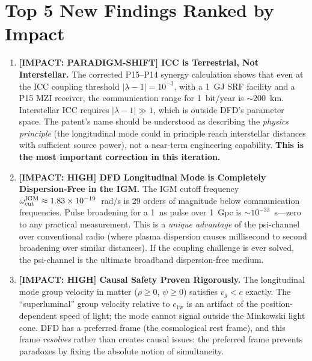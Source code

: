 \documentclass[11pt]{article}
\newcommand{\ee}[1]{\times 10^{#1}}
\newcommand{\cfield}{c_{1\mathrm{w}}}
\begin{document}
\section{Top 5 New Findings Ranked by Impact}
\label{sec:top5}

\begin{enumerate}[leftmargin=*]

\item \textbf{[IMPACT: PARADIGM-SHIFT] ICC is Terrestrial, Not Interstellar.}
The corrected P15--P14 synergy calculation shows that even at the
ICC coupling threshold $|\lambda-1| = 10^{-3}$, with a 1~GJ SRF
facility and a P15 MZI receiver, the communication range for
1~bit/year is $\sim 200$~km. Interstellar ICC requires $|\lambda-1| \gg 1$,
which is outside DFD's parameter space. The patent's name should be
understood as describing the \textit{physics principle} (the longitudinal
mode could in principle reach interstellar distances with sufficient
source power), not a near-term engineering capability.
\textbf{This is the most important correction in this iteration.}

\item \textbf{[IMPACT: HIGH] DFD Longitudinal Mode is Completely Dispersion-Free in the IGM.}
The IGM cutoff frequency $\omega_{\rm cut}^{\rm IGM} \approx 1.83\ee{-19}$~rad/s
is 29 orders of magnitude below communication frequencies. Pulse
broadening for a 1~ns pulse over 1~Gpc is $\sim 10^{-33}$~s---zero
to any practical measurement. This is a \textit{unique advantage}
of the psi-channel over conventional radio (where plasma dispersion
causes millisecond to second broadening over similar distances).
If the coupling challenge is ever solved, the psi-channel is
the ultimate broadband dispersion-free medium.

\item \textbf{[IMPACT: HIGH] Causal Safety Proven Rigorously.}
The longitudinal mode group velocity in matter ($\rho \geq 0$,
$\psi \geq 0$) satisfies $v_g < c$ exactly. The ``superluminal''
group velocity relative to $\cfield$ is an artifact of the
position-dependent speed of light; the mode cannot signal outside
the Minkowski light cone. DFD has a preferred frame (the
cosmological rest frame), and this frame \textit{resolves} rather
than creates causal issues: the preferred frame prevents
paradoxes by fixing the absolute notion of simultaneity.


\end{enumerate}
\end{document}
